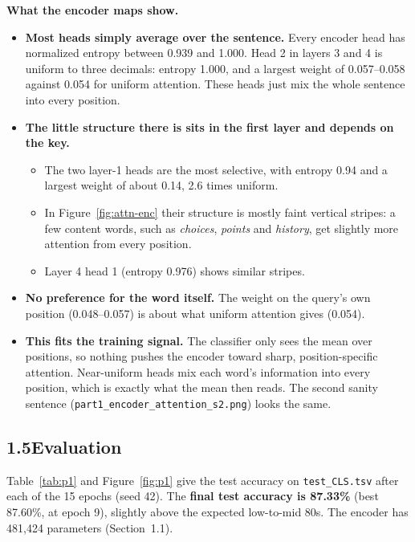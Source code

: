 \documentclass[11pt]{article}
\newcommand{\code}[1]{\texttt{#1}}
\begin{document}
\textbf{What the encoder maps show.}
\begin{itemize}
  \item \textbf{Most heads simply average over the sentence.} Every encoder head has normalized entropy between 0.939 and 1.000. Head 2 in layers 3 and 4 is uniform to three decimals: entropy 1.000, and a largest weight of 0.057--0.058 against 0.054 for uniform attention. These heads just mix the whole sentence into every position.
  \item \textbf{The little structure there is sits in the first layer and depends on the key.}
  \begin{itemize}
    \item The two layer-1 heads are the most selective, with entropy 0.94 and a largest weight of about 0.14, 2.6 times uniform.
    \item In Figure~\ref{fig:attn-enc} their structure is mostly faint vertical stripes: a few content words, such as \textit{choices}, \textit{points} and \textit{history}, get slightly more attention from every position.
    \item Layer 4 head 1 (entropy 0.976) shows similar stripes.
  \end{itemize}
  \item \textbf{No preference for the word itself.} The weight on the query's own position (0.048--0.057) is about what uniform attention gives (0.054).
  \item \textbf{This fits the training signal.} The classifier only sees the mean over positions, so nothing pushes the encoder toward sharp, position-specific attention. Near-uniform heads mix each word's information into every position, which is exactly what the mean then reads. The second sanity sentence (\code{part1\_encoder\_attention\_s2.png}) looks the same.
\end{itemize}

\subsection*{1.5\quad Evaluation}

Table~\ref{tab:p1} and Figure~\ref{fig:p1} give the test accuracy on \code{test\_CLS.tsv} after each of the 15 epochs (seed 42). The \textbf{final test accuracy is 87.33\%} (best 87.60\%, at epoch 9), slightly above the expected low-to-mid 80s. The encoder has 481{,}424 parameters (Section~1.1).
\end{document}
